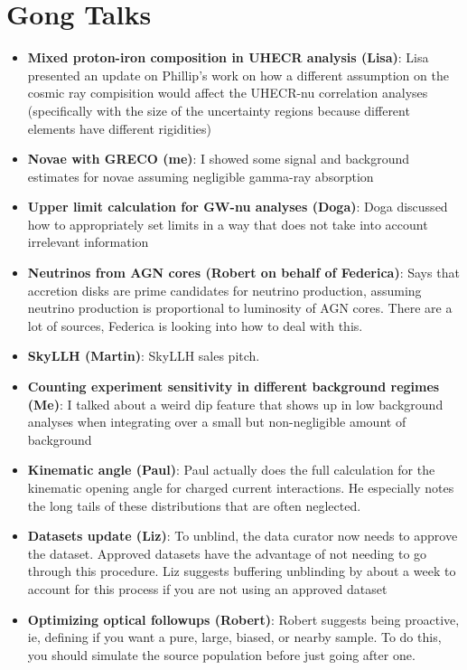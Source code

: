 \section{Gong Talks}
\begin{itemize}
    \item \textbf{Mixed proton-iron composition in UHECR analysis (Lisa)}: Lisa presented an update on Phillip's work on how a different assumption on the cosmic ray compisition would affect the UHECR-nu correlation analyses (specifically with the size of the uncertainty regions because different elements have different rigidities)
    \item \textbf{Novae with GRECO (me)}: I showed some signal and background estimates for novae assuming negligible gamma-ray absorption
    \item \textbf{Upper limit calculation for GW-nu analyses (Doga)}: Doga discussed how to appropriately set limits in a way that does not take into account irrelevant information
    \item \textbf{Neutrinos from AGN cores (Robert on behalf of Federica)}: Says that accretion disks are prime candidates for neutrino production, assuming neutrino production is proportional to luminosity of AGN cores. There are a lot of sources, Federica is looking into how to deal with this.
    \item \textbf{SkyLLH (Martin)}: SkyLLH sales pitch.
    \item \textbf{Counting experiment sensitivity in different background regimes (Me)}: I talked about a weird dip feature that shows up in low background analyses when integrating over a small but non-negligible amount of background
    \item \textbf{Kinematic angle (Paul)}: Paul actually does the full calculation for the kinematic opening angle for charged current interactions. He especially notes the long tails of these distributions that are often neglected.
    \item \textbf{Datasets update (Liz)}: To unblind, the data curator now needs to approve the dataset. Approved datasets have the advantage of not needing to go through this procedure. Liz suggests buffering unblinding by about a week to account for this process if you are not using an approved dataset
    \item \textbf{Optimizing optical followups (Robert)}: Robert suggests being proactive, ie, defining if you want a pure, large, biased, or nearby sample. To do this, you should simulate the source population before just going after one.

\end{itemize}
